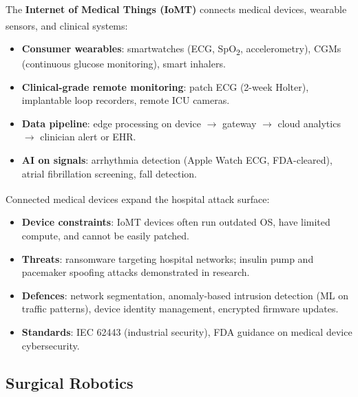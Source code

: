 \begin{tcbitemize}[ skin=sectionraster ]
    \tcbitem[title={Wearables and Remote Monitoring}, raster multicolumn=3]
    The \textbf{Internet of Medical Things (IoMT)} connects medical devices, wearable sensors, and clinical systems\textsuperscript{\cite[][]{cardonaInternetMedicalThings2021}}:
    \begin{itemize}
        \item \textbf{Consumer wearables}: smartwatches (ECG, SpO\textsubscript{2}, accelerometry), CGMs (continuous glucose monitoring), smart inhalers.
        \item \textbf{Clinical-grade remote monitoring}: patch ECG (2-week Holter), implantable loop recorders, remote ICU cameras.
        \item \textbf{Data pipeline}: edge processing on device $\to$ gateway $\to$ cloud analytics $\to$ clinician alert or EHR.
        \item \textbf{AI on signals}: arrhythmia detection (Apple Watch ECG, FDA-cleared), atrial fibrillation screening, fall detection.
    \end{itemize}

    \tcbitem[title={IoMT Cybersecurity}, raster multicolumn=3]
    Connected medical devices expand the hospital attack surface\textsuperscript{\cite[][]{cardonaInternetMedicalThings2021}}:
    \begin{itemize}
        \item \textbf{Device constraints}: IoMT devices often run outdated OS, have limited compute, and cannot be easily patched.
        \item \textbf{Threats}: ransomware targeting hospital networks; insulin pump and pacemaker spoofing attacks demonstrated in research.
        \item \textbf{Defences}: network segmentation, anomaly-based intrusion detection (ML on traffic patterns), device identity management, encrypted firmware updates.
        \item \textbf{Standards}: IEC 62443 (industrial security), FDA guidance on medical device cybersecurity.
    \end{itemize}
\end{tcbitemize}

\subsection{Surgical Robotics}

